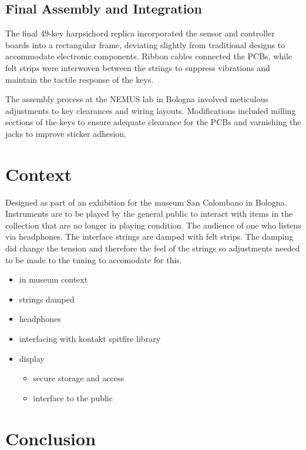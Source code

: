 \subsection{Final Assembly and Integration}

The final 49-key harpsichord replica incorporated the sensor and controller boards into a rectangular frame, deviating slightly from traditional designs to accommodate electronic components. Ribbon cables connected the PCBs, while felt strips were interwoven between the strings to suppress vibrations and maintain the tactile response of the keys.

The assembly process at the NEMUS lab in Bologna involved meticulous adjustments to key clearances and wiring layouts. Modifications included milling sections of the keys to ensure adequate clearance for the PCBs and varnishing the jacks to improve sticker adhesion.

\section{Context}\label{context}

Designed as part of an exhibition for the museum San Colombano in Bologna. Instruments are to be played by the general public to interact with items in the collection that are no longer in playing condition. The audience of one who listens via headphones. The interface strings are damped with felt strips. The damping did change the tension and therefore the feel of the strings so
adjustments needed to be made to the tuning to accomodate for this.

\begin{itemize}
\item
  in museum context
\item
  strings damped
\item
  headphones
\item
  interfacing with kontakt spitfire library
\item
  display

  \begin{itemize}
  \item
    secure storage and access
  \item
    interface to the public
  \end{itemize}
\end{itemize}



\section{Conclusion}\label{conclusion}

